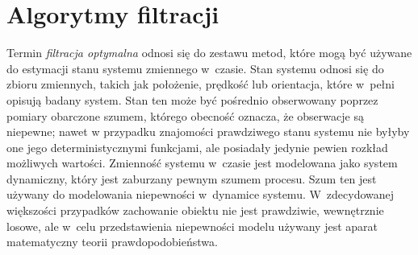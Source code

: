 \chapter{Algorytmy filtracji}
\label{cha:algorytmy}
Termin \textit{filtracja optymalna} odnosi się do zestawu metod, które mogą być używane do estymacji stanu systemu zmiennego w~czasie. Stan systemu odnosi się do zbioru zmiennych, takich jak położenie, prędkość lub orientacja, które w~pełni opisują badany system. Stan ten może być pośrednio obserwowany poprzez pomiary obarczone szumem, którego obecność oznacza, że obserwacje są niepewne; nawet w przypadku znajomości prawdziwego stanu systemu nie byłyby one jego deterministycznymi funkcjami, ale posiadały jedynie pewien rozkład możliwych wartości. Zmienność systemu w~czasie jest modelowana jako system dynamiczny, który jest zaburzany pewnym szumem procesu. Szum ten jest używany do modelowania niepewności w~dynamice systemu. W~zdecydowanej większości przypadków zachowanie obiektu nie jest prawdziwie, wewnętrznie losowe, ale w~celu przedstawienia niepewności modelu używany jest aparat matematyczny teorii prawdopodobieństwa.\par

